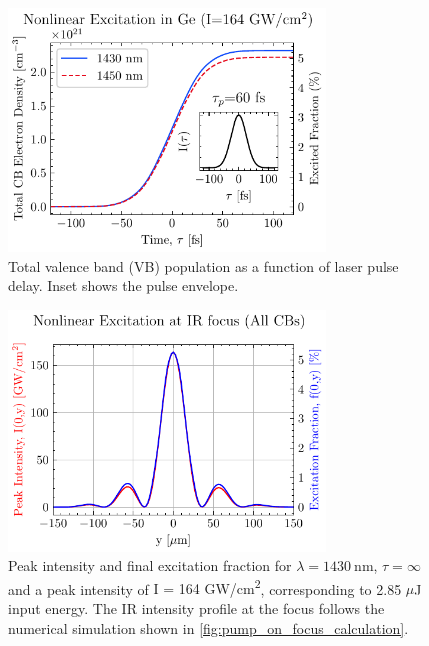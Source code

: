 \begin{figure}
	\centering
	\includegraphics[width=0.75\textwidth]{figures/chap4/Total_CB_dens_vs_Time.pdf}
	\caption{Total valence band (VB) population as a function of laser pulse delay. Inset shows the pulse envelope.}
	\label{fig:Total_CB_dens_vs_Time}
\end{figure}

\begin{figure}
	\centering
	\includegraphics[width=0.75\textwidth]{figures/chap4/excitation_at_focus.pdf}
	\caption{Peak intensity and final excitation fraction for $\lambda = 1430 \ \textrm{nm}$, $\tau = \infty$ and a peak intensity of {I = 164 GW/cm\textsuperscript{2}}, corresponding to 2.85 $\mu$J input energy. The IR intensity profile at the focus follows the numerical simulation shown in \cref{fig:pump_on_focus_calculation}.}
	\label{fig:excitation_at_focus}
\end{figure}



